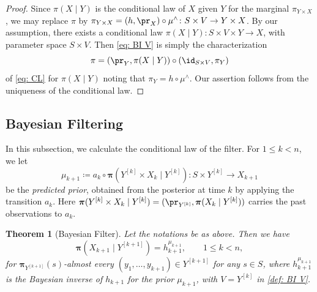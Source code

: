\documentclass[12pt,reqno]{amsart}%
\theoremstyle{plain}
\newtheorem{theorem}{Theorem}[section]
\theoremstyle{definition}
\def\bspi{\boldsymbol{\pi}}
\begin{document}
\begin{proof}
	Since $\pi(X\mid Y)$ is the conditional law of $X$ given $Y$ for the marginal $\pi_{Y\times X}$,
	we may replace $\pi$ by $\pi_{Y\times X}=(h,\pr_X)\circ\mu^\wedge\colon S\times V\rightarrow Y\times X$.
	By our assumption, there exists
	a conditional law $\pi(X\mid Y)\colon S\times V\times Y\rightarrow X$, with parameter space $S\times V$.
	Then \eqref{eq: BI V} is simply the characterization
	\[
		\pi=(\pr_Y, \pi(X\mid Y))\circ (\id_{S\times V},\pi_Y)
	\]
	of \eqref{eq: CL} for $\pi(X\mid Y)$ noting that $\pi_Y=h\circ\mu^\wedge$.
	Our assertion follows from the uniqueness of the conditional law.
\end{proof}


%
\subsection{Bayesian Filtering}
%

In this subsection,
we calculate the conditional law of the filter.
For $1\leq k<n$, we let
\[
	\mu_{k+1}\coloneqq a_k\circ\bspi(Y^{[k]}\times X_k\mid Y^{[k]})\colon S\times Y^{[k]}\rightarrow X_{k+1}
\]
be the \emph{predicted prior}, obtained from
the posterior at time $k$ by applying the transition $a_k$.
Here $\bspi(Y^{[k]}\times X_k\mid Y^{[k]})=(\pr_{Y^{[k]}},\bspi(X_k\mid Y^{[k]}))$ carries the past observations to $a_k$.

\begin{theorem}[Bayesian Filter]\label{thm: BF}
	Let the notations be as above.  Then we have
	\[
		\bspi(X_{k+1}\mid Y^{[k+1]})= h_{k+1}^{\mu_{k+1}},\qquad 1\leq k<n,
	\]
	for $\bspi_{Y^{[k+1]}}(s)$-almost every $(y_1,\ldots,y_{k+1})\in Y^{[k+1]}$
	for any $s\in S$,
	where $h_{k+1}^{\mu_{k+1}}$ is the Bayesian inverse of $h_{k+1}$
	for the prior $\mu_{k+1}$, with $V=Y^{[k]}$ in \cref{def: BI V}.
\end{theorem}
\end{document}
